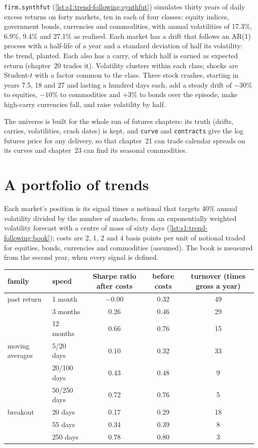 \texttt{firm.synthfut} (\cref{lst:s1:trend-following:synthfut}) simulates thirty years of daily excess returns on forty markets, ten in each of four
classes: equity indices, government bonds, currencies and commodities, with annual volatilities of 17.3\%, 6.9\%, 9.4\% and 27.1\% as realised. Each
market has a drift that follows an AR(1) process with a half-life of a year and a standard deviation of half its volatility: the trend, planted. Each
also has a carry, of which half is earned as expected return (chapter~20 trades it). Volatility clusters within each class; shocks are Student-$t$ with a
factor common to the class. Three stock crashes, starting in years 7.5, 18 and 27 and lasting a hundred days each, add a steady drift of $-30\%$ to equities, $-10\%$ to
commodities and $+3\%$ to bonds over the episode, make high-carry currencies fall, and raise volatility by half.

The universe is built for the whole run of futures chapters: its truth (drifts, carries, volatilities, crash dates) is kept, and \texttt{curve} and
\texttt{contracts} give the log futures price for any delivery, so that chapter~21 can trade calendar spreads on its curves and chapter~23 can find its
seasonal commodities.

\section{A portfolio of trends}

Each market's position is its signal times a notional that targets 40\% annual volatility divided by the number of markets, from an exponentially
weighted volatility forecast with a centre of mass of sixty days (\cref{lst:s1:trend-following:book}); costs are 2, 1, 2 and 4 basis points per unit of
notional traded for equities, bonds, currencies and commodities (assumed). The book is measured from the second year, when every signal is defined.

\begin{center}
\small
\begin{tabular}{@{}llccc@{}}
\toprule
family & speed & Sharpe ratio after costs & before costs & turnover (times gross a year)\\
\midrule
past return & 1 month & $-0.00$ & 0.32 & 49\\
 & 3 months & 0.26 & 0.46 & 29\\
 & 12 months & 0.66 & 0.76 & 15\\
moving averages & 5/20 days & 0.10 & 0.32 & 33\\
 & 20/100 days & 0.43 & 0.48 & 9\\
 & 50/250 days & 0.72 & 0.76 & 5\\
breakout & 20 days & 0.17 & 0.29 & 18\\
 & 55 days & 0.34 & 0.39 & 8\\
 & 250 days & 0.78 & 0.80 & 3\\
\bottomrule
\end{tabular}
\end{center}

